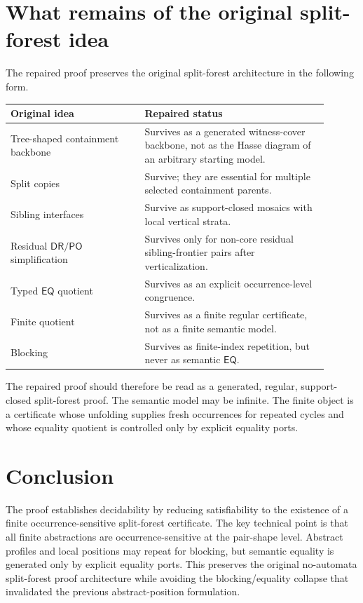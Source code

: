 \documentclass[11pt]{article}
\newcommand{\EQ}{\mathsf{EQ}}
\newcommand{\PO}{\mathsf{PO}}
\newcommand{\DR}{\mathsf{DR}}
\begin{document}
\section{What remains of the original split-forest idea}

The repaired proof preserves the original split-forest architecture in the following form.
\begin{center}
\begin{tabular}{p{0.38\linewidth}p{0.52\linewidth}}
\toprule
Original idea & Repaired status \\
\midrule
Tree-shaped containment backbone & Survives as a generated witness-cover backbone, not as the Hasse diagram of an arbitrary starting model. \\
Split copies & Survive; they are essential for multiple selected containment parents. \\
Sibling interfaces & Survive as support-closed mosaics with local vertical strata. \\
Residual \(\DR/\PO\) simplification & Survives only for non-core residual sibling-frontier pairs after verticalization. \\
Typed \(\EQ\) quotient & Survives as an explicit occurrence-level congruence. \\
Finite quotient & Survives as a finite regular certificate, not as a finite semantic model. \\
Blocking & Survives as finite-index repetition, but never as semantic \(\EQ\). \\
\bottomrule
\end{tabular}
\end{center}

The repaired proof should therefore be read as a generated, regular, support-closed split-forest proof.  The semantic model may be infinite.  The finite object is a certificate whose unfolding supplies fresh occurrences for repeated cycles and whose equality quotient is controlled only by explicit equality ports.

\section{Conclusion}

The proof establishes decidability by reducing satisfiability to the existence of a finite occurrence-sensitive split-forest certificate.  The key technical point is that all finite abstractions are occurrence-sensitive at the pair-shape level.  Abstract profiles and local positions may repeat for blocking, but semantic equality is generated only by explicit equality ports.  This preserves the original no-automata split-forest proof architecture while avoiding the blocking/equality collapse that invalidated the previous abstract-position formulation.
\end{document}
